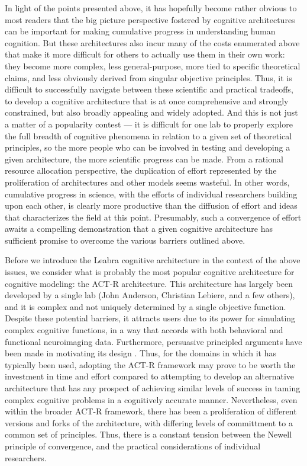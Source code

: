 \documentclass[11pt,twoside]{article}
\begin{document}
In light of the points presented above, it has hopefully become rather obvious
to most readers that the big picture perspective fostered by cognitive
architectures can be important for making cumulative progress in understanding
human cognition.  But these architectures also incur many of the costs
enumerated above that make it more difficult for others to actually use them
in their own work: they become more complex, less general-purpose, more tied
to specific theoretical claims, and less obviously derived from singular
objective principles.  Thus, it is difficult to successfully navigate between
these scientific and practical tradeoffs, to develop a cognitive architecture
that is at once comprehensive and strongly constrained, but also broadly
appealing and widely adopted.  And this is not just a matter of a popularity
contest --- it is difficult for one lab to properly explore the full breadth
of cognitive phenomena in relation to a given set of theoretical principles,
so the more people who can be involved in testing and developing a given
architecture, the more scientific progress can be made.  From a rational
resource allocation perspective, the duplication of effort represented by the
proliferation of architectures and other models seems wasteful.  In other
words, cumulative progress in science, with the efforts of individual
researchers building upon each other, is clearly more productive than the
diffusion of effort and ideas that characterizes the field at this point.
Presumably, such a convergence of effort awaits a compelling demonstration
that a given cognitive architecture has sufficient promise to overcome the
various barriers outlined above.

Before we introduce the Leabra cognitive architecture in the context of the
above issues, we consider what is probably the most popular cognitive
architecture for cognitive modeling: the ACT-R architecture.  This
architecture has largely been developed by a single lab (John Anderson,
Christian Lebiere, and a few others), and it is complex and not uniquely
determined by a single objective function.  Despite these potential barriers,
it attracts users due to its power for simulating complex cognitive functions,
in a way that accords with both behavioral and functional neuroimaging data.
Furthermore, persuasive principled arguments have been made in motivating its
design \cite{Anderson83,Anderson90,Anderson93,AndersonBothellByrneEtAl04}.
Thus, for the domains in which it has typically been used, adopting the ACT-R
framework may prove to be worth the investment in time and effort compared to
attempting to develop an alternative architecture that has any prospect of
achieving similar levels of success in taming complex cognitive problems in a
cognitively accurate manner.  Nevertheless, even within the broader ACT-R
framework, there has been a proliferation of different versions and forks of
the architecture, with differing levels of committment to a common set of
principles.  Thus, there is a constant tension between the Newell principle of
convergence, and the practical considerations of individual researchers.
\end{document}
